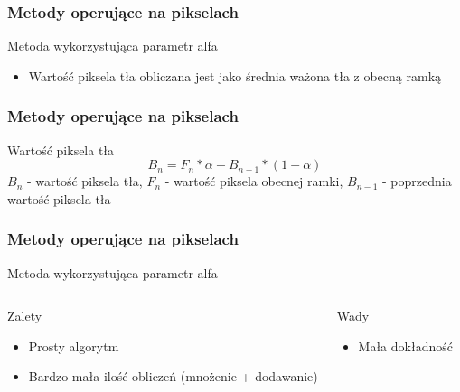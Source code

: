 \documentclass{beamer}
\begin{document}
\begin{frame}
\frametitle{Metody operujące na pikselach}
\begin{block}{Metoda wykorzystująca parametr alfa}
\begin{itemize}
\item Wartość piksela tła obliczana jest jako średnia ważona tła z obecną ramką
\end{itemize}
\end{block}


\end{frame}

\begin{frame}
\frametitle{Metody operujące na pikselach}
\begin{block}{Wartość piksela tła}
  \begin{equation}
  \label{alpha}
  B_{n} = F_{n} * \alpha + B_{n-1} * (1-\alpha)
  \end{equation}
  $B_n$ - wartość piksela tła,\newline
  $F_n$ - wartość piksela obecnej ramki,\newline
  $B_{n-1}$ - poprzednia wartość piksela tła  
\end{block}


\end{frame}

\begin{frame}
\frametitle{Metody operujące na pikselach}
\begin{block}{Metoda wykorzystująca parametr alfa}
\begin{columns}
\begin{block}{Zalety}
\begin{itemize}
\item Prosty algorytm
\item Bardzo mała ilość obliczeń (mnożenie + dodawanie)
\end{itemize}
\end{block}
\begin{block}{Wady}
\begin{itemize}
\item Mała dokładność
\end{itemize}
\end{block}
\end{columns}
\end{block}




\end{frame}
\end{document}
